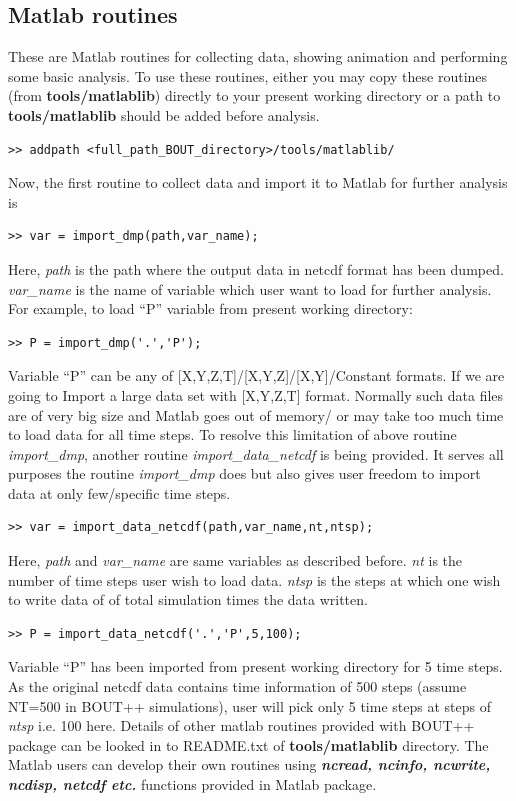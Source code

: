 \documentclass[12pt]{article}
\begin{document}
\subsection{Matlab routines}
\label{sec:matlabroutines}
These are Matlab routines for collecting data, showing animation and performing some basic analysis.
To use these routines, either you may copy these routines (from {\bf tools/matlablib}) directly to your present working directory
or a path to {\bf tools/matlablib} should be added before analysis.
%
\begin{verbatim}
>> addpath <full_path_BOUT_directory>/tools/matlablib/ 
\end{verbatim}
%
Now, the first routine to collect data and import it to Matlab for further analysis is
%
\begin{verbatim}
>> var = import_dmp(path,var_name); 
\end{verbatim}
%
Here, {\it path} is the path where the output data in netcdf format has been dumped. {\it var\_name} is the name of variable
which user want to load for further analysis. For example, to load ``P'' variable from present working directory:
%
\begin{verbatim}
>> P = import_dmp('.','P'); 
\end{verbatim}
%
Variable ``P'' can be any of [X,Y,Z,T]/[X,Y,Z]/[X,Y]/Constant formats.
%
If we are going to Import a large data set with [X,Y,Z,T] format. Normally such data files are of very big size and 
Matlab goes out of memory/ or may take too much time to load data for all time steps. To resolve this limitation of 
above routine {\it import\_dmp}, another routine {\it import\_data\_netcdf} is being provided. It serves all purposes
the routine {\it import\_dmp} does but also gives user freedom to import data at only few/specific time steps. 
%
\begin{verbatim}
>> var = import_data_netcdf(path,var_name,nt,ntsp); 
\end{verbatim}
%
Here, {\it path} and {\it var\_name} are same variables as described before. {\it nt} is the number of time steps user wish to load data.
{\it ntsp} is the steps at which one wish to write data of of total simulation times the data written.
%
\begin{verbatim}
>> P = import_data_netcdf('.','P',5,100); 
\end{verbatim}
%
Variable ``P'' has been imported from present working directory for 5 time steps. As the original netcdf data contains time information 
of 500 steps (assume NT=500 in BOUT++ simulations), user will pick only 5 time steps at steps of {\it ntsp} i.e. 100 here. 
%
Details of other matlab routines provided with BOUT++ package can be looked in to README.txt of {\bf tools/matlablib} directory.
The Matlab users can develop their own routines using {\bf \it ncread, ncinfo, ncwrite, ncdisp, netcdf etc.} functions provided in 
Matlab package.
\end{document}
